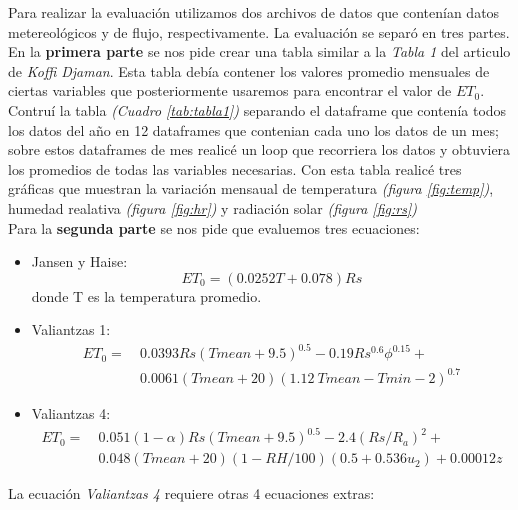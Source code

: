 \documentclass[12pt]{article}
\begin{document}
Para realizar la evaluaci\'on utilizamos dos archivos de datos que conten\'ian datos metereol\'ogicos y de flujo, respectivamente. La evaluaci\'on se separ\'o en tres partes. En la \textbf{primera parte} se nos pide crear una tabla similar a la  \textit{Tabla 1} del articulo de \textit{Koffi Djaman}. Esta tabla deb\'ia contener los valores promedio mensuales de ciertas variables que posteriormente usaremos para encontrar el valor de $ET_0$.\\
Contru\'i la tabla \textit{(Cuadro \ref{tab:tabla1})} separando el dataframe que conten\'ia todos los datos del año en 12 dataframes que contenian cada uno los datos de un mes; sobre estos dataframes de mes realic\'e un loop que recorriera los datos y obtuviera los promedios de todas las variables necesarias.
Con esta tabla realic\'e tres gr\'aficas que muestran la variaci\'on mensaual de temperatura \textit{(figura \ref{fig:temp})}, humedad realativa \textit{(figura \ref{fig:hr})} y radiaci\'on solar \textit{(figura \ref{fig:rs})}\\
Para la \textbf{segunda parte} se nos pide que evaluemos tres ecuaciones:\\
\begin{itemize}
    \item 
        Jansen y Haise:
        $$ET_0 = (0.0252T + 0.078)Rs$$
        donde T es la temperatura promedio.
    \item
        Valiantzas 1:
        \begin{equation*}
        \begin{split}
        ET_0 = \ &0.0393Rs(Tmean + 9.5)^{0.5} - 0.19Rs^{0.6}\phi^{0.15} + \\
                 &0.0061(Tmean + 20)(1.12 \ Tmean - Tmin - 2)^{0.7}
        \end{split}
        \end{equation*}

    \item
        Valiantzas 4:
        \begin{equation*}
        \begin{split}
            ET_0 = \ &0.051(1-\alpha)Rs(Tmean + 9.5)^{0.5} - 2.4(Rs/R_a)^2 + \\
                     &0.048(Tmean + 20)(1 - RH/100)(0.5 + 0.536u_2) + 0.00012z
        \end{split}
        \end{equation*}
    \end{itemize}

La ecuaci\'on \textit{Valiantzas 4} requiere otras 4 ecuaciones extras:
\end{document}
